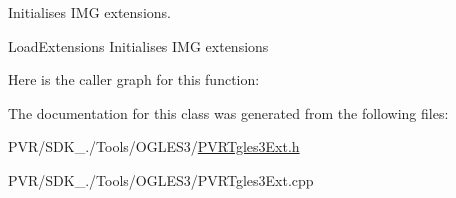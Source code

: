 Initialises I\+M\+G extensions. 







  Load\+Extensions  Initialises I\+M\+G extensions 

Here is the caller graph for this function\+:




The documentation for this class was generated from the following files\+:\begin{DoxyCompactItemize}
\item 
P\+V\+R/\+S\+D\+K\+\_./\+Tools/\+O\+G\+L\+E\+S3/\hyperlink{_p_v_r_tgles3_ext_8h}{P\+V\+R\+Tgles3\+Ext.\+h}\item 
P\+V\+R/\+S\+D\+K\+\_./\+Tools/\+O\+G\+L\+E\+S3/P\+V\+R\+Tgles3\+Ext.\+cpp\end{DoxyCompactItemize}
